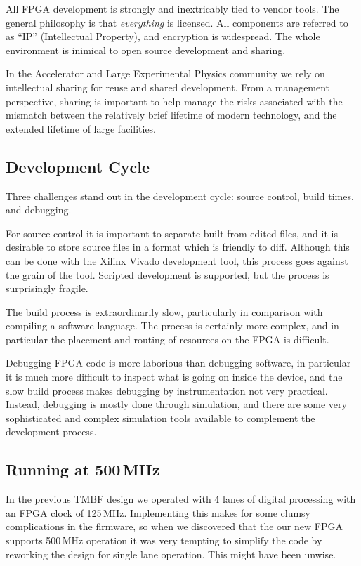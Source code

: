 \documentclass[
    a4paper,
    keeplastbox,            %
    hyphens,                %
]{jacow-2_1}
\begin{document}
All FPGA development is strongly and inextricably tied to vendor tools.  The
general philosophy is that \emph{everything} is licensed.  All components
are referred to as ``IP'' (Intellectual Property), and encryption is widespread.
The whole environment is inimical to open source development and sharing.

In the Accelerator and Large Experimental Physics community we rely on
intellectual sharing for reuse and shared development.  From a management
perspective, sharing is important to help manage the risks associated with the
mismatch between the relatively brief lifetime of modern technology, and the
extended lifetime of large facilities.


\subsection{Development Cycle}

Three challenges stand out in the development cycle: source control, build
times, and debugging.

For source control it is important to separate built from edited files, and it
is desirable to store source files in a format which is friendly to diff.
Although this can be done with the Xilinx Vivado development tool, this process
goes against the grain of the tool.  Scripted development is supported, but the
process is surprisingly fragile.

The build process is extraordinarily slow, particularly in comparison with
compiling a software language.  The process is certainly more complex, and in
particular the placement and routing of resources on the FPGA is difficult.

Debugging FPGA code is more laborious than debugging software, in particular it
is much more difficult to inspect what is going on inside the device, and the
slow build process makes debugging by instrumentation not very practical.
Instead, debugging is mostly done through simulation, and there are some very
sophisticated and complex simulation tools available to complement the
development process.


\subsection{Running at 500\,MHz}

In the previous TMBF design we operated with 4 lanes of digital processing with
an FPGA clock of 125\,MHz.  Implementing this makes for some clumsy
complications in the firmware, so when we discovered that the our new FPGA
supports 500\,MHz operation it was very tempting to simplify the code by
reworking the design for single lane operation.  This might have been unwise.
\end{document}
